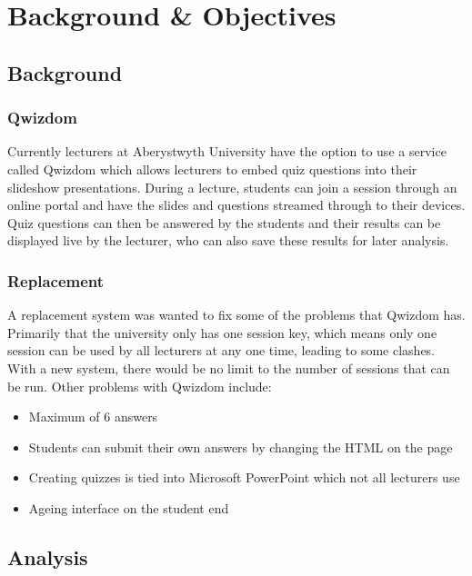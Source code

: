 \chapter{Background \& Objectives}
\section{Background} 
\subsection{Qwizdom}
Currently lecturers at Aberystwyth University have the option to use a service called Qwizdom\cite{Qwizdom} which allows lecturers to embed quiz questions into their slideshow presentations. During a lecture, students can join a session through an online portal and have the slides and questions streamed through to their devices. Quiz questions can then be answered by the students and their results can be displayed live by the lecturer, who can also save these results for later analysis.

\subsection{Replacement}
A replacement system was wanted to fix some of the problems that Qwizdom has. Primarily that the university only has one session key, which means only one session can be used by all lecturers at any one time, leading to some clashes. With a new system, there would be no limit to the number of sessions that can be run. Other problems with Qwizdom include:
\begin{itemize}
	\item Maximum of 6 answers
	\item Students can submit their own answers by changing the HTML on the page
	\item Creating quizzes is tied into Microsoft PowerPoint which not all lecturers use
	\item Ageing interface on the student end
\end{itemize}

\section{Analysis}
